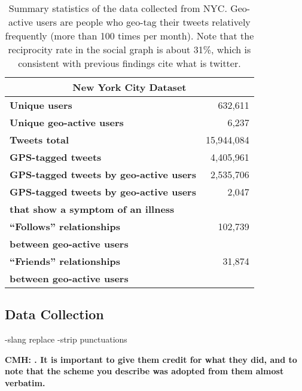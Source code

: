 \documentclass[11pt]{article}
\begin{document}
\begin{table}[t]
\small
\centering
\begin{tabular}{ l | r }
\multicolumn{2}{c}{\textbf{New York City Dataset}} \\
\hline
\textbf{Unique users}&       632,611      \\
\hline
\textbf{Unique geo-active users}&        6,237       \\
\hline
\textbf{Tweets total}&        15,944,084\\
\hline
\textbf{GPS-tagged tweets}&   4,405,961\\
\hline
\textbf{GPS-tagged tweets by geo-active users}&  2,535,706\\
\hline
\textbf{GPS-tagged tweets by geo-active users}&  2,047 \\
\textbf{that show a symptom of an illness}&\\
\hline
\textbf{``Follows'' relationships}&  102,739  \\
\textbf{between geo-active users}&\\
\hline
\textbf{``Friends'' relationships}&   31,874   \\
\textbf{between geo-active users}&\\
\end{tabular}
\caption{\small Summary statistics of the data collected from NYC. Geo-active users are people who geo-tag their tweets relatively frequently (more than 100 times per month). Note that the reciprocity rate in the social graph is about 31\%, which is consistent with previous findings  cite what is twitter.} 
\label{table::dataset}
\end{table}
\subsection{Data Collection}
-slang replace
-strip punctuations

\textbf{CMH: \cite{Jay}. It is important to give them credit for what they did, and to note that the scheme you describe was adopted from them almost verbatim.}
\end{document}
